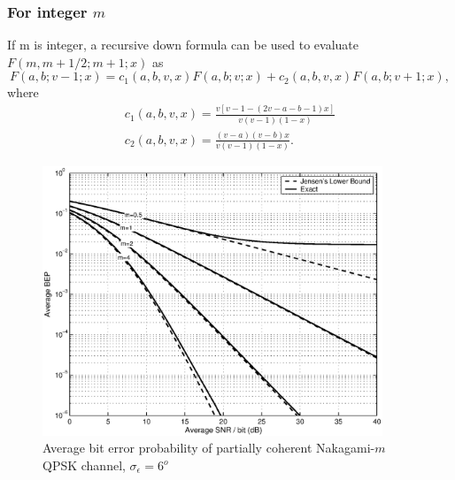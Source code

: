 \subsubsection{For integer $m$}
If m is integer, a recursive down formula\cite [eq.
15.2.12]{abramowitz:1972} can be used to evaluate
$F(m,m+1/2;m+1;x)$  as
\begin{equation}
\label{upper:17}
F(a,b;v-1;x)=c_1(a,b,v,x)F(a,b;v;x)+c_2(a,b,v,x)F(a,b;v+1;x),
\end{equation}
where
\begin{equation}
\label{upper:18}
\begin{split}
c_1(a,b,v,x)=\frac{v[v-1-(2v-a-b-1)x]}{v(v-1)(1-x)}\\
c_2(a,b,v,x)=\frac{(v-a)(v-b)x}{v(v-1)(1-x)}.
\end{split}
\end{equation}
\begin{figure}[tbp]
\centerline{\includegraphics[width=4in]{./upper001.eps}} 
\caption[]
{Average bit error probability of partially coherent Nakagami-$m$ QPSK channel, $\sigma_\epsilon=6^o$}
\end{figure}
